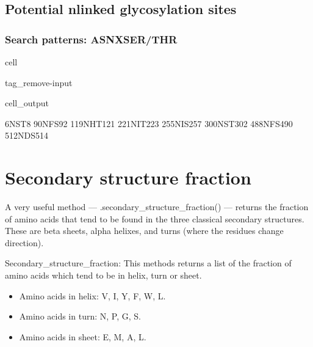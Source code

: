 \documentclass[letterpaper,10pt,english]{jupyterBook}
\begin{document}
\section{Potential n\sphinxhyphen{}linked glycosylation sites}
\label{\detokenize{ipynb/chapter2:potential-n-linked-glycosylation-sites}}

\subsection{Search patterns: ASN\sphinxhyphen{}X\sphinxhyphen{}SER/THR}
\label{\detokenize{ipynb/chapter2:search-patterns-asn-x-ser-thr}}
\begin{sphinxuseclass}{cell}
\begin{sphinxuseclass}{tag_remove-input}\begin{sphinxVerbatimOutput}

\begin{sphinxuseclass}{cell_output}
\begin{sphinxVerbatim}[commandchars=\\\{\}]
6\PYGZhy{}NST\PYGZhy{}8
90\PYGZhy{}NFS\PYGZhy{}92
119\PYGZhy{}NHT\PYGZhy{}121
221\PYGZhy{}NIT\PYGZhy{}223
255\PYGZhy{}NIS\PYGZhy{}257
300\PYGZhy{}NST\PYGZhy{}302
488\PYGZhy{}NFS\PYGZhy{}490
512\PYGZhy{}NDS\PYGZhy{}514
\end{sphinxVerbatim}

\end{sphinxuseclass}\end{sphinxVerbatimOutput}

\end{sphinxuseclass}
\end{sphinxuseclass}

\chapter{Secondary structure fraction}
\label{\detokenize{ipynb/chapter2:secondary-structure-fraction}}
\sphinxAtStartPar
A very useful method — .secondary\_structure\_fraction() — returns the fraction of amino acids that tend to be found in the three classical secondary structures. These are beta sheets, alpha helixes, and turns (where the residues change direction).

\sphinxAtStartPar
Secondary\_structure\_fraction: This methods returns a list of the fraction of amino acids which tend to be in helix, turn or sheet.
\begin{itemize}
\item {} 
\sphinxAtStartPar
Amino acids in helix: V, I, Y, F, W, L.

\item {} 
\sphinxAtStartPar
Amino acids in turn: N, P, G, S.

\item {} 
\sphinxAtStartPar
Amino acids in sheet: E, M, A, L.

\end{itemize}
\end{document}
